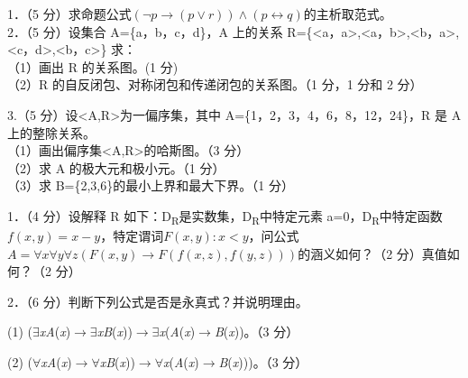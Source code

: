 \documentclass[fontset=exam]{exam-zh}
\begin{document}

\par{}\smallskip

1．（5 分）求命题公式\(\left. (\neg p\rightarrow(p \vee r)) \land (p\leftrightarrow q) \right.\)的主析取范式。\\
2．（5 分）设集合 A=\{a，b，c，d\}，A 上的关系 R=\{\textless a，a\textgreater,\textless a，b\textgreater,\textless b，a\textgreater,\textless c，d\textgreater,\textless b，c\textgreater\} 求：\\
（1）画出 R 的关系图。(1 分)\\
（2）R 的自反闭包、对称闭包和传递闭包的关系图。（1 分，1 分和 2 分）

3.（5 分）设\textless A,R\textgreater 为一偏序集，其中 A=\{1，2，3，4，6，8，12，24\}，R 是 A 上的整除关系。\\
（1）画出偏序集\textless A,R\textgreater 的哈斯图。（3 分）\\
（2）求 A 的极大元和极小元。（1 分）\\
（3）求 B=\{2,3,6\}的最小上界和最大下界。（1 分）


\par{}\smallskip

1．（4 分）设解释 R 如下：D\textsubscript{R}是实数集，D\textsubscript{R}中特定元素 a=0，D\textsubscript{R}中特定函数\(f(x,y) = x - y\)，特定谓词\(F(x,y):x < y\)，问公式\(\left. A = \forall x\forall y\forall z(F(x,y)\rightarrow F(f(x,z),f(y,z))) \right.\)的涵义如何？（2 分）真值如何？（2 分）

2．（6 分）判断下列公式是否是永真式？并说明理由。

(1) (\(\exists\)\emph{xA}(\emph{x})\(\to\)\(\exists\)\emph{xB}(\emph{x}))\(\to\)\(\exists\)\emph{x}(\emph{A}(\emph{x})\(\to\)\emph{B}(\emph{x}))。（3 分）

(2) (\(\forall\)\emph{xA}(\emph{x})\(\to\)\(\forall\)\emph{xB}(\emph{x}))\(\to\)\(\forall\)\emph{x}(\emph{A}(\emph{x})\(\to\)\emph{B}(\emph{x})))。（3 分）

\end{document}
